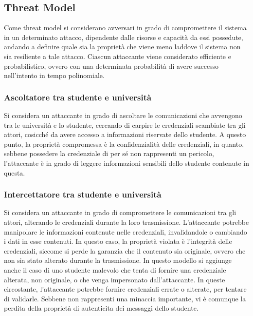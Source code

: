 \documentclass[a4paper,12pt]{article}
\begin{document}
\subsection{Threat Model}
Come threat model si considerano avversari in grado di compromettere il sistema in un determinato attacco, dipendente dalle risorse e capacità da essi possedute, andando a definire quale sia la proprietà che viene meno laddove il sistema non sia resiliente a tale attacco.
\newline Ciascun attaccante viene considerato efficiente e probabilistico, ovvero con una determinata probabilità di avere successo nell'intento in tempo polinomiale.
\subsubsection{Ascoltatore tra studente e università} Si considera un attaccante in grado di ascoltare le comunicazioni che avvengono tra le università e lo studente, cercando di carpire le credenziali scambiate tra gli attori, cosicché da avere accesso a informazioni riservate dello studente.
\newline A questo punto, la proprietà compromessa è la confidenzialità delle credenziali, in quanto, sebbene possedere la credenziale di per sé non rappresenti un pericolo, l'attaccante è in grado di leggere informazioni sensibili dello studente contenute in questa.
\subsubsection{Intercettatore tra studente e università} Si considera un attaccante in grado di compromettere le comunicazioni tra gli attori, alterando le credenziali durante la loro trasmissione. L'attaccante potrebbe manipolare le informazioni contenute nelle credenziali, invalidandole o cambiando i dati in esse contenuti.
\newline In questo caso, la proprietà violata è l'integrità delle credenziali, siccome si perde la garanzia che il contenuto sia originale, ovvero che non sia stato alterato durante la trasmissione.
\newline In questo modello si aggiunge anche il caso di uno studente malevolo che tenta di fornire una credenziale alterata, non originale, o che venga impersonato dall'attaccante. In queste circostante, l'attaccante potrebbe fornire credenziali errate o alterate, per tentare di validarle.
\newline Sebbene non rappresenti una minaccia importante, vi è comunque la perdita della proprietà di autenticita dei messaggi dello studente.
\end{document}
